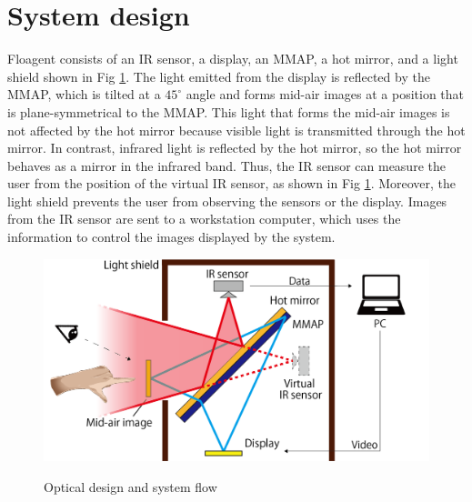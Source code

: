 \documentclass[sigconf]{acmart}
\begin{document}
\section{System design \label{proposed}}

Floagent consists of an IR sensor, a display, an MMAP, a hot mirror, and a light shield shown in Fig \ref{fig:hot-MMAPs}.
The light emitted from the display is reflected by the MMAP, which is tilted at a $45^\circ$ angle and forms mid-air images at a position that is plane-symmetrical to the MMAP.
This light that forms the mid-air images is not affected by the hot mirror because visible light is transmitted through the hot mirror.
In contrast, infrared light is reflected by the hot mirror, so the hot mirror behaves as a mirror in the infrared band.
Thus, the IR sensor can measure the user from the position of the virtual IR sensor, as shown in Fig \ref{fig:hot-MMAPs}.
Moreover, the light shield prevents the user from observing the sensors or the display.
Images from the IR sensor are sent to a workstation computer, which uses the information to control the images displayed by the system.

\begin{figure}[bt]
  \begin{center}
    \includegraphics[width=0.8\linewidth]{images/hot-MMAPs_system.png}
    \vspace{-0.8\baselineskip}
    \caption{Optical design and system flow}
    \vspace{-1.5\baselineskip}
    \label{fig:hot-MMAPs}
  \end{center}
\end{figure}
\end{document}
